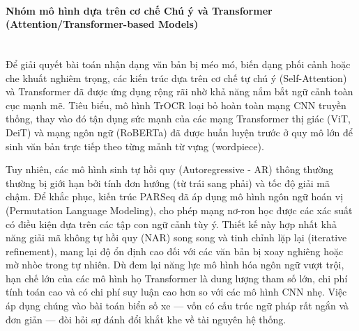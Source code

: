 \documentclass[../DoAn.tex]{subfiles}
\begin{document}
\paragraph{Nhóm mô hình dựa trên cơ chế Chú ý và Transformer (Attention/Transformer-based Models)}
\mbox{}\\
Để giải quyết bài toán nhận dạng văn bản bị méo mó, biến dạng phối cảnh hoặc che khuất nghiêm trọng, các kiến trúc dựa trên cơ chế tự chú ý (Self-Attention) và Transformer đã được ứng dụng rộng rãi nhờ khả năng nắm bắt ngữ cảnh toàn cục mạnh mẽ. Tiêu biểu, mô hình TrOCR \cite{li2021trocr} loại bỏ hoàn toàn mạng CNN truyền thống, thay vào đó tận dụng sức mạnh của các mạng Transformer thị giác (ViT, DeiT) và mạng ngôn ngữ (RoBERTa) đã được huấn luyện trước ở quy mô lớn để sinh văn bản trực tiếp theo từng mảnh từ vựng (wordpiece).

Tuy nhiên, các mô hình sinh tự hồi quy (Autoregressive - AR) thông thường thường bị giới hạn bởi tính đơn hướng (từ trái sang phải) và tốc độ giải mã chậm. Để khắc phục, kiến trúc PARSeq \cite{bautista2022scene} đã áp dụng mô hình ngôn ngữ hoán vị (Permutation Language Modeling), cho phép mạng nơ-ron học được các xác suất có điều kiện dựa trên các tập con ngữ cảnh tùy ý. Thiết kế này hợp nhất khả năng giải mã không tự hồi quy (NAR) song song và tinh chỉnh lặp lại (iterative refinement), mang lại độ ổn định cao đối với các văn bản bị xoay nghiêng hoặc mờ nhòe trong tự nhiên. Dù đem lại năng lực mô hình hóa ngôn ngữ vượt trội, hạn chế lớn của các mô hình họ Transformer là dung lượng tham số lớn, chi phí tính toán cao và có chi phí suy luận cao hơn so với các mô hình CNN nhẹ. Việc áp dụng chúng vào bài toán biển số xe — vốn có cấu trúc ngữ pháp rất ngắn và đơn giản — đòi hỏi sự đánh đổi khắt khe về tài nguyên hệ thống.
\end{document}
